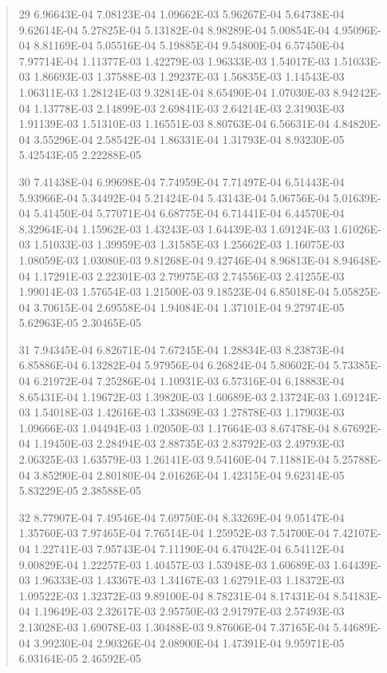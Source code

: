 \documentclass[letterpaper,10pt,english]{sphinxmanual}
\begin{document}
\begin{quote}
\begin{DUlineblock}{0em}
\item[] 29   6.96643E-04  7.08123E-04  1.09662E-03  5.96267E-04  5.64738E-04  9.62614E-04  5.27825E-04  5.13182E-04  8.98289E-04  5.00854E-04  4.95096E-04  8.81169E-04  5.05516E-04  5.19885E-04  9.54800E-04  6.57450E-04  7.97714E-04  1.11377E-03  1.42279E-03  1.96333E-03  1.54017E-03  1.51033E-03  1.86693E-03  1.37588E-03  1.29237E-03  1.56835E-03  1.14543E-03  1.06311E-03  1.28124E-03  9.32814E-04  8.65490E-04  1.07030E-03  8.94242E-04  1.13778E-03  2.14899E-03  2.69841E-03  2.64214E-03  2.31903E-03  1.91139E-03  1.51310E-03  1.16551E-03  8.80763E-04  6.56631E-04  4.84820E-04  3.55296E-04  2.58542E-04  1.86331E-04  1.31793E-04  8.93230E-05  5.42543E-05  2.22288E-05
\item[] 30   7.41438E-04  6.99698E-04  7.74959E-04  7.71497E-04  6.51443E-04  5.93966E-04  5.34492E-04  5.21424E-04  5.43143E-04  5.06756E-04  5.01639E-04  5.41450E-04  5.77071E-04  6.68775E-04  6.71441E-04  6.44570E-04  8.32964E-04  1.15962E-03  1.43243E-03  1.64439E-03  1.69124E-03  1.61026E-03  1.51033E-03  1.39959E-03  1.31585E-03  1.25662E-03  1.16075E-03  1.08059E-03  1.03080E-03  9.81268E-04  9.42746E-04  8.96813E-04  8.94648E-04  1.17291E-03  2.22301E-03  2.79975E-03  2.74556E-03  2.41255E-03  1.99014E-03  1.57654E-03  1.21500E-03  9.18523E-04  6.85018E-04  5.05825E-04  3.70615E-04  2.69558E-04  1.94084E-04  1.37101E-04  9.27974E-05  5.62963E-05  2.30465E-05
\item[] 31   7.94345E-04  6.82671E-04  7.67245E-04  1.28834E-03  8.23873E-04  6.85886E-04  6.13282E-04  5.97956E-04  6.26824E-04  5.80602E-04  5.73385E-04  6.21972E-04  7.25286E-04  1.10931E-03  6.57316E-04  6.18883E-04  8.65431E-04  1.19672E-03  1.39820E-03  1.60689E-03  2.13724E-03  1.69124E-03  1.54018E-03  1.42616E-03  1.33869E-03  1.27878E-03  1.17903E-03  1.09666E-03  1.04494E-03  1.02050E-03  1.17664E-03  8.67478E-04  8.67692E-04  1.19450E-03  2.28494E-03  2.88735E-03  2.83792E-03  2.49793E-03  2.06325E-03  1.63579E-03  1.26141E-03  9.54160E-04  7.11881E-04  5.25788E-04  3.85290E-04  2.80180E-04  2.01626E-04  1.42315E-04  9.62314E-05  5.83229E-05  2.38588E-05
\item[] 32   8.77907E-04  7.49546E-04  7.69750E-04  8.33269E-04  9.05147E-04  1.35760E-03  7.97465E-04  7.76514E-04  1.25952E-03  7.54700E-04  7.42107E-04  1.22741E-03  7.95743E-04  7.11190E-04  6.47042E-04  6.54112E-04  9.00829E-04  1.22257E-03  1.40457E-03  1.53948E-03  1.60689E-03  1.64439E-03  1.96333E-03  1.43367E-03  1.34167E-03  1.62791E-03  1.18372E-03  1.09522E-03  1.32372E-03  9.89100E-04  8.78231E-04  8.17431E-04  8.54183E-04  1.19649E-03  2.32617E-03  2.95750E-03  2.91797E-03  2.57493E-03  2.13028E-03  1.69078E-03  1.30488E-03  9.87606E-04  7.37165E-04  5.44689E-04  3.99230E-04  2.90326E-04  2.08900E-04  1.47391E-04  9.95971E-05  6.03164E-05  2.46592E-05

\end{DUlineblock}
\end{quote}
\end{document}
